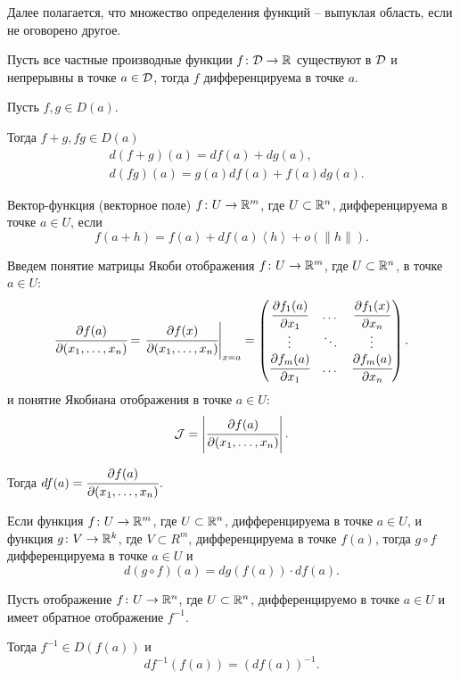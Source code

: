 	\begin{remark}
		Далее полагается, что множество определения функций -- выпуклая область, если не оговорено другое.
	\end{remark}

	\begin{theorem}
		Пусть все частные производные функции $f\colon \mathcal{D} \to \mathbb{R}$ существуют в $\mathcal{D}$ и непрерывны в точке $a\in\mathcal{D}$, тогда $f$ дифференцируема в точке $a$.
	\end{theorem}

	\begin{theorem}
		Пусть $f, g \in D(a)$. 
		
		Тогда $f+g, fg \in D(a)$ 
		\begin{align*}
			&d(f+g)(a) = df(a)+dg(a),\\
			&d(fg)(a)=g(a)df(a)+f(a)dg(a).
		\end{align*}
	\end{theorem}
	
	\begin{mdef}
		Вектор-функция (векторное поле) $f\colon U \to \mathbb{R}^m$, где $U \subset \mathbb{R}^n$, дифференцируема в точке $a\in U$, если 	
		$$
			f(a+h)=f(a)+df(a)\left< h\right> +o(\|h\|).
		$$
	\end{mdef}

	\begin{mdef}
		Введем понятие матрицы Якоби отображения $f\colon U \to \mathbb{R}^m$, где $U \subset \mathbb{R}^n$, в точке $a\in U$:
		$$
			\cfrac {\partial f(a)} {\partial(x_1, \ldots, x_n)} = \left. \cfrac {\partial f(x)} {\partial(x_1, \ldots, x_n)} \right|_{x=a} = \begin{pmatrix}
				\cfrac {\partial f_1(a)} {\partial x_1} & \dots & \cfrac {\partial f_1(x)} {\partial x_n} \\
				\vdots & \ddots & \vdots \\
				\cfrac {\partial f_m(a)} {\partial x _1} & \dots & \cfrac {\partial f_m(a)} {\partial x_n}
			\end{pmatrix}.
		$$
		и понятие Якобиана отображения в точке $a \in U$:
		$$
			\mathcal{J} = \left|  \cfrac {\partial f(a)} {\partial(x_1, \ldots, x_n)}  \right|.
		$$
	
		Тогда $df(a) = \cfrac {\partial f(a)} {\partial(x_1, \ldots, x_n)}$.
	\end{mdef}
	
	\begin{theorem}
		Если функция $f\colon U \to \mathbb{R}^m$, где $U \subset \mathbb{R}^n$, дифференцируема в точке $a\in U$, и функция $g \colon V \to \mathbb{R}^k$, где $V \subset R^m$, дифференцируема в точке $f(a)$, тогда
		$g \circ f$ дифференцируема в точке $a \in U$ и 
		$$
			d(g \circ f)(a) = dg(f(a))\cdot df(a).
		$$
	\end{theorem}
	\begin{corollary}
		Пусть отображение $f\colon U \to \mathbb{R}^n$, где $U \subset \mathbb{R}^n$, дифференцируемо в точке $a\in U$ и  имеет обратное отображение $f^{-1}$.
		
		Тогда $f^{-1} \in D(f(a))$ и 
		$$
			df^{-1}(f(a)) = (df(a))^{-1}.
		$$
	\end{corollary}
	
